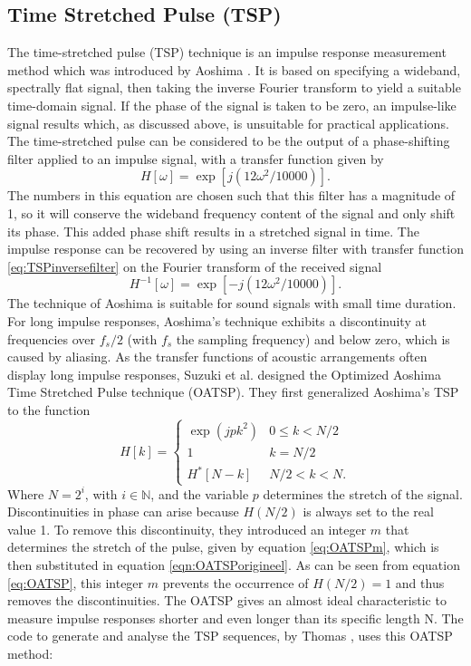 \subsection{Time Stretched Pulse (TSP)}
The time-stretched pulse (TSP) technique is an impulse response measurement method which was introduced by Aoshima \cite{Aoshima19811484}.
It is based on specifying a wideband, spectrally flat signal, then taking the inverse Fourier transform to yield a suitable time-domain signal.
If the phase of the signal is taken to be zero, an impulse-like signal results which, as discussed above, is unsuitable for practical applications.
The time-stretched pulse can be considered to be the output of a phase-shifting filter applied to an impulse signal, with a transfer function given by
\begin{equation}
H[\omega] = \exp[j(12\omega^{2}/10000)].
\label{eq:TSPfilter}
\end{equation}
The numbers in this equation are chosen such that this filter has a magnitude of 1, so it will conserve the wideband frequency content of the signal and only shift its phase.
This added phase shift results in a stretched signal in time.
The impulse response can be recovered by using an inverse filter with transfer function \eqref{eq:TSPinversefilter} on the Fourier transform of the received signal
\begin{equation}
H^{-1}[\omega] = \exp[-j(12\omega^{2}/10000)].
\label{eq:TSPinversefilter}
\end{equation}
The technique of Aoshima is suitable for sound signals with small time duration.
For long impulse responses, Aoshima's technique exhibits a discontinuity at frequencies over $f_{s}/2$ (with $f_s$ the sampling frequency) and below zero, which is caused by aliasing.
As the transfer functions of acoustic arrangements often display long impulse responses, Suzuki et al. \cite{Suzuki19951119} designed the Optimized Aoshima Time Stretched Pulse technique (OATSP).
They first generalized Aoshima's TSP to the function
\begin{equation}
\label{eqn:OATSPorigineel}
H[k]=\left\{
\begin{array}{ll}
\exp(jpk^2)& 0 \leq k < N/2\\
1&k=N/2\\
H^{*} [N-k] & N/2 < k < N.
\end{array}
\right.
\end{equation}    
Where $N=2^{i}$, with $i\in\mathbb{N}$, and the variable $p$ determines the stretch of the signal. 
Discontinuities in phase can arise because $H(N/2)$ is always set to the real value 1.
To remove this discontinuity, they introduced an integer $m$ that determines the stretch of the pulse, given by equation \eqref{eq:OATSPm}, which is then substituted in equation \eqref{eqn:OATSPorigineel}.
As can be seen from equation \eqref{eq:OATSP}, this integer $m$ prevents the occurrence of $H(N/2) = 1$ and thus removes the discontinuities.
The OATSP gives an almost ideal characteristic to measure impulse responses shorter and even longer than its specific length N.
The code to generate and analyse the TSP sequences, by Thomas \cite{Thomas2006}, uses this OATSP method:

